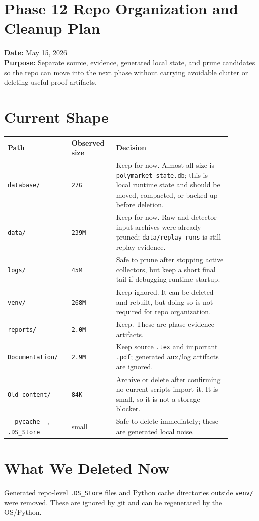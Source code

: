 \documentclass{article}
\begin{document}
\section*{Phase 12 Repo Organization and Cleanup Plan}

\textbf{Date:} May 15, 2026\\
\textbf{Purpose:} Separate source, evidence, generated local state, and prune candidates so the repo can move into the next phase without carrying avoidable clutter or deleting useful proof artifacts.

\section*{Current Shape}
\begin{longtable}{p{0.24\linewidth}p{0.18\linewidth}p{0.46\linewidth}}
\textbf{Path} & \textbf{Observed size} & \textbf{Decision} \\
\texttt{database/} & \texttt{27G} & Keep for now. Almost all size is \texttt{polymarket\_state.db}; this is local runtime state and should be moved, compacted, or backed up before deletion. \\
\texttt{data/} & \texttt{239M} & Keep for now. Raw and detector-input archives were already pruned; \texttt{data/replay\_runs} is still replay evidence. \\
\texttt{logs/} & \texttt{45M} & Safe to prune after stopping active collectors, but keep a short final tail if debugging runtime startup. \\
\texttt{venv/} & \texttt{268M} & Keep ignored. It can be deleted and rebuilt, but doing so is not required for repo organization. \\
\texttt{reports/} & \texttt{2.0M} & Keep. These are phase evidence artifacts. \\
\texttt{Documentation/} & \texttt{2.9M} & Keep source \texttt{.tex} and important \texttt{.pdf}; generated aux/log artifacts are ignored. \\
\texttt{Old-content/} & \texttt{84K} & Archive or delete after confirming no current scripts import it. It is small, so it is not a storage blocker. \\
\texttt{\_\_pycache\_\_}, \texttt{.DS\_Store} & small & Safe to delete immediately; these are generated local noise. \\
\end{longtable}

\section*{What We Deleted Now}
Generated repo-level \texttt{.DS\_Store} files and Python cache directories outside \texttt{venv/} were removed. These are ignored by git and can be regenerated by the OS/Python.
\end{document}
